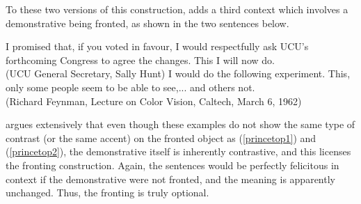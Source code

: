 To these two versions of this construction, \citet{caitldiss} adds a third context which involves a demonstrative being fronted, as shown in the two sentences below.


\begin{exe}
\ex \label{dem1} I promised that, if you voted in favour, I would respectfully ask UCU's forthcoming Congress to agree the changes.
This I will now do.\\
(UCU General Secretary, Sally Hunt)
\ex \label{dem2} I would do the following experiment.
This, only some people seem to be able to see,... and others not.\\
(Richard Feynman, Lecture on Color Vision, Caltech, March 6, 1962)
\end{exe}

\noindent \citet{caitldiss} argues extensively that even though these examples do not show the same type of contrast (or the same accent) on the fronted object as (\ref{princetop1}) and (\ref{princetop2}), the demonstrative itself is inherently contrastive, and this licenses the fronting construction.
Again, the sentences would be perfectly felicitous in context if the demonstrative were not fronted, and the meaning is apparently unchanged.
Thus, the fronting is truly optional.

